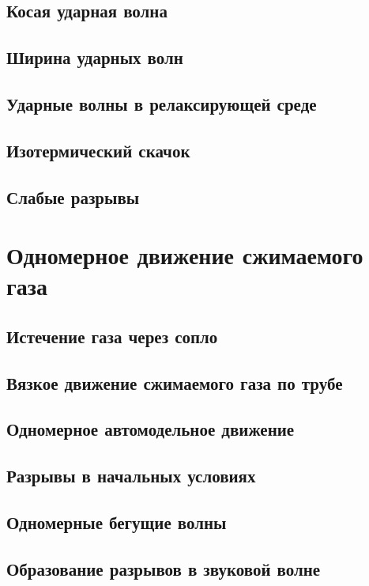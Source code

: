 \documentclass[12pt,a4paper]{book}
\begin{document}
\section{Косая ударная волна}\label{sec:p92}
\section{Ширина ударных волн}\label{sec:p93}
\section{Ударные волны в релаксирующей среде}\label{sec:p94}
\section{Изотермический скачок}\label{sec:p95}
\section{Слабые разрывы}\label{sec:p96}

\chapter{Одномерное движение сжимаемого газа}
\section{Истечение газа через сопло}\label{sec:p97}
\section{Вязкое движение сжимаемого газа по трубе}\label{sec:p98}
\section{Одномерное автомодельное движение}\label{sec:p99}
\section{Разрывы в начальных условиях}\label{sec:p100}
\section{Одномерные бегущие волны}\label{sec:p101}
\section{Образование разрывов в звуковой волне}\label{sec:p102}
\end{document}
